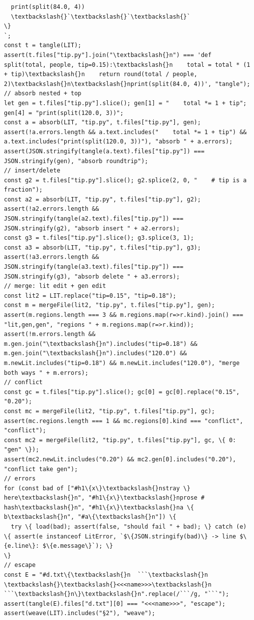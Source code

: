 \documentclass[10pt,a4paper]{article}
\begin{document}
\begin{Verbatim}
  print(split(84.0, 4))
  \textbackslash{}`\textbackslash{}`\textbackslash{}`
\}
`;
const t = tangle(LIT);
assert(t.files["tip.py"].join("\textbackslash{}n") === 'def split(total, people, tip=0.15):\textbackslash{}n    total = total * (1 + tip)\textbackslash{}n    return round(total / people, 2)\textbackslash{}n\textbackslash{}nprint(split(84.0, 4))', "tangle");
// absorb nested + top
let gen = t.files["tip.py"].slice(); gen[1] = "    total *= 1 + tip"; gen[4] = "print(split(120.0, 3))";
const a = absorb(LIT, "tip.py", t.files["tip.py"], gen);
assert(!a.errors.length && a.text.includes("    total *= 1 + tip") && a.text.includes("print(split(120.0, 3))"), "absorb " + a.errors);
assert(JSON.stringify(tangle(a.text).files["tip.py"]) === JSON.stringify(gen), "absorb roundtrip");
// insert/delete
const g2 = t.files["tip.py"].slice(); g2.splice(2, 0, "    # tip is a fraction");
const a2 = absorb(LIT, "tip.py", t.files["tip.py"], g2);
assert(!a2.errors.length && JSON.stringify(tangle(a2.text).files["tip.py"]) === JSON.stringify(g2), "absorb insert " + a2.errors);
const g3 = t.files["tip.py"].slice(); g3.splice(3, 1);
const a3 = absorb(LIT, "tip.py", t.files["tip.py"], g3);
assert(!a3.errors.length && JSON.stringify(tangle(a3.text).files["tip.py"]) === JSON.stringify(g3), "absorb delete " + a3.errors);
// merge: lit edit + gen edit
const lit2 = LIT.replace("tip=0.15", "tip=0.18");
const m = mergeFile(lit2, "tip.py", t.files["tip.py"], gen);
assert(m.regions.length === 3 && m.regions.map(r=>r.kind).join() === "lit,gen,gen", "regions " + m.regions.map(r=>r.kind));
assert(!m.errors.length && m.gen.join("\textbackslash{}n").includes("tip=0.18") && m.gen.join("\textbackslash{}n").includes("120.0") && m.newLit.includes("tip=0.18") && m.newLit.includes("120.0"), "merge both ways " + m.errors);
// conflict
const gc = t.files["tip.py"].slice(); gc[0] = gc[0].replace("0.15", "0.20");
const mc = mergeFile(lit2, "tip.py", t.files["tip.py"], gc);
assert(mc.regions.length === 1 && mc.regions[0].kind === "conflict", "conflict");
const mc2 = mergeFile(lit2, "tip.py", t.files["tip.py"], gc, \{ 0: "gen" \});
assert(mc2.newLit.includes("0.20") && mc2.gen[0].includes("0.20"), "conflict take gen");
// errors
for (const bad of ["#h1\{x\}\textbackslash{}nstray \} here\textbackslash{}n", "#h1\{x\}\textbackslash{}nprose # hash\textbackslash{}n", "#h1\{x\}\textbackslash{}na \{ b\textbackslash{}n", "#a\{\textbackslash{}n"]) \{
  try \{ load(bad); assert(false, "should fail " + bad); \} catch (e) \{ assert(e instanceof LitError, `$\{JSON.stringify(bad)\} -> line $\{e.line\}: $\{e.message\}`); \}
\}
// escape
const E = "#d.txt\{\textbackslash{}n  ```\textbackslash{}n  \textbackslash{}\textbackslash{}<<<name>>>\textbackslash{}n  ```\textbackslash{}n\}\textbackslash{}n".replace(/```/g, "```");
assert(tangle(E).files["d.txt"][0] === "<<<name>>>", "escape");
assert(weave(LIT).includes("§2"), "weave");
\end{Verbatim}
\end{document}
